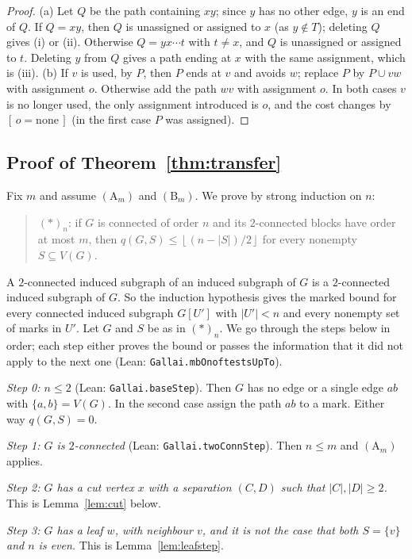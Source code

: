 \documentclass[11pt]{amsart}
\theoremstyle{definition}
\theoremstyle{remark}
\renewcommand{\_}{\oldunderscore\allowbreak}
\newcommand{\lean}[1]{\textup{(Lean: {\small\texttt{#1}})}}
\newcommand{\fl}[1]{\left\lfloor #1\right\rfloor}
\newcommand{\TA}{\mathrm{A}}
\newcommand{\TB}{\mathrm{B}}
\newcommand{\ind}[1]{[\,#1\,]}
\begin{document}
\begin{proof}
(a) Let $Q$ be the path containing $xy$; since $y$ has no other edge, $y$ is an end of $Q$. If
$Q=xy$, then $Q$ is unassigned or assigned to $x$ (as $y\notin T$); deleting $Q$ gives (i) or (ii).
Otherwise $Q=yx\cdots t$ with $t\ne x$, and $Q$ is unassigned or assigned to $t$. Deleting $y$ from
$Q$ gives a path ending at $x$ with the same assignment, which is (iii).
(b) If $v$ is used, by $P$, then $P$ ends at $v$ and avoids $w$; replace $P$ by $P\cup vw$ with
assignment $o$. Otherwise add the path $wv$ with assignment $o$. In both cases $v$ is no longer used,
the only assignment introduced is $o$, and the cost changes by $\ind{o=\text{none}}$ (in the first
case $P$ was assigned).
\end{proof}

\subsection{Proof of Theorem~\ref{thm:transfer}}
Fix $m$ and assume $(\TA_m)$ and $(\TB_m)$. We prove by strong induction on $n$:
\begin{quote}
$(\ast)_n$: if $G$ is connected of order $n$ and its $2$-connected blocks have order at most $m$,
then $q(G,S)\le\fl{(n-|S|)/2}$ for every nonempty $S\subseteq V(G)$.
\end{quote}
A $2$-connected induced subgraph of an induced subgraph of $G$ is a $2$-connected induced subgraph of
$G$. So the induction hypothesis gives the marked bound for every connected induced subgraph
$G[U']$ with $|U'|<n$ and every nonempty set of marks in $U'$. Let $G$ and $S$ be as in $(\ast)_n$.
We go through the steps below in order; each step either proves the bound or passes the
information that it did not apply to the next one \lean{Gallai.mbOn\_of\_testsUpTo}.

\emph{Step 0: $n\le2$} \lean{Gallai.baseStep}. Then $G$ has no edge or a single edge $ab$ with
$\{a,b\}=V(G)$. In the second case assign the path $ab$ to a mark. Either way $q(G,S)=0$.

\emph{Step 1: $G$ is $2$-connected} \lean{Gallai.twoConnStep}. Then $n\le m$ and $(\TA_m)$
applies.

\emph{Step 2: $G$ has a cut vertex $x$ with a separation $(C,D)$ such that $|C|,|D|\ge2$.} This is
Lemma~\ref{lem:cut} below.

\emph{Step 3: $G$ has a leaf $w$, with neighbour $v$, and it is not the case that both $S=\{v\}$
and $n$ is even.} This is Lemma~\ref{lem:leafstep}.
\end{document}
